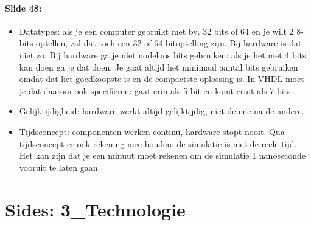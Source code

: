 \documentclass[10pt,a4paper]{book}
\begin{document}
\paragraph{Slide 48:}
\begin{itemize} 
\item Datatypes: als je een computer gebruikt met bv. 32 bits of 64 en je wilt 2 8-bits optellen, zal dat toch een 32 of 64-bitoptelling zijn. Bij hardware is dat niet zo. Bij hardware ga je niet nodeloos bits gebruiken: als je het met 4 bits kan doen ga je dat doen. Je gaat altijd het minimaal aantal bits gebruiken omdat dat het goedkoopste is en de compactste oplossing is. In VHDL moet je dat daarom ook specifi\"eren: gaat erin als 5 bit en komt eruit als 7 bits.
\item Gelijktijdigheid: hardware werkt altijd gelijktijdig, niet de ene na de andere.
\item Tijdsconcept: componenten werken continu, hardware stopt nooit. Qua tijdsconcept er ook rekening mee houden: de simulatie is niet de re\"ele tijd. Het kan zijn dat je een minuut moet rekenen om de simulatie 1 nanoseconde vooruit te laten gaan.
\end{itemize}
	
\section{Sides: 3\_Technologie}
\end{document}
